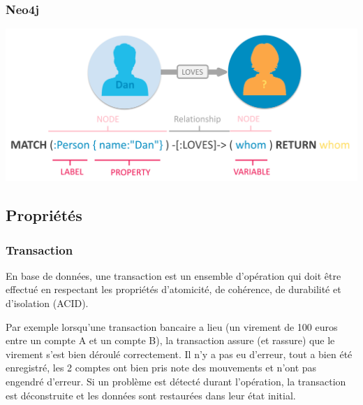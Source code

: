 \begin{frame}
    \frametitle{Neo4j}
    \centering
    \includegraphics[width=0.7\linewidth]{figures/persistence/neo4j-cypher}
\end{frame}

%

\subsection{Propriétés}

\begin{frame}
    \frametitle{Transaction}

    En base de données,
    une transaction est un ensemble d’opération qui doit être effectué
    en respectant les propriétés d’atomicité, de cohérence, de durabilité et d’isolation (ACID).

    \bigskip
    Par exemple lorsqu’une transaction bancaire a lieu
    (un virement de 100 euros entre un compte A et un compte B),
    la transaction assure (et rassure) que le virement s’est bien déroulé correctement.
    Il n’y a pas eu d’erreur, tout a bien été enregistré,
    les 2 comptes ont bien pris note des mouvements et n’ont pas engendré d’erreur.
    Si un problème est détecté durant l’opération,
    la transaction est déconstruite et les données sont restaurées dans leur état initial.
\end{frame}

